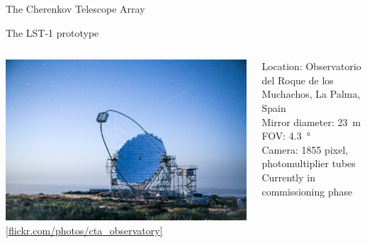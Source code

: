 \begin{frame}{The Cherenkov Telescope Array}
\end{frame}

\begin{frame}{The LST-1 prototype}
  \begin{columns}[onlytextwidth]
    \begin{column}{0.5\textwidth}
      \includegraphics[width=\textwidth]{images/LST_1.jpg}\\
      \small\href{https://www.flickr.com/photos/cta_observatory/albums/72157671493684827/with/48629242378/}{[flickr.com/photos/cta\_observatory]}
    \end{column}
    \begin{column}{0.45\textwidth}
      \textcolor{tugreen}{Location:} Observatorio del Roque de los Muchachos, La Palma, Spain\\
      \textcolor{tugreen}{Mirror diameter:} \SI{23}{\meter}\\
      \textcolor{tugreen}{FOV:} \SI{4.3}{\degree}\\
      \textcolor{tugreen}{Camera:} \num{1855} pixel, photomultiplier tubes\\
      \medskip
      \textbf{\textcolor{tugreen}{\to}} Currently in commissioning phase
    \end{column}
  \end{columns}

\end{frame}